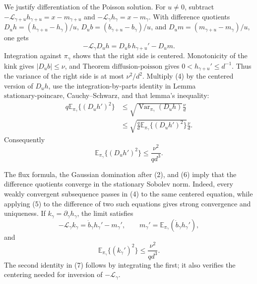 We justify differentiation of the Poisson solution.  For \(u\ne0\), subtract
\(-\mathcal L_{\gamma+u}h_{\gamma+u}=x-m_{\gamma+u}\) and
\(-\mathcal L_\gamma h_\gamma=x-m_\gamma\).  With difference quotients \(D_uh=(h_{\gamma+u}-h_\gamma)/u\), \(D_ub=(b_{\gamma+u}-b_\gamma)/u\), and \(D_um=(m_{\gamma+u}-m_\gamma)/u\), one gets
\[
 -\mathcal L_\gamma D_uh=D_ub\,h_{\gamma+u}'-D_um.           \tag{4}
\]
Integration against \(\pi_\gamma\) shows that the right side is centered.  Monotonicity of the kink gives \(|D_ub|\leq\nu\), and Theorem \(\mathrm{diffusion\mbox{-}poisson}\) gives \(0<h_{\gamma+u}'\leq d^{-1}\).  Thus the variance of the right side is at most \(\nu^2/d^2\).  Multiply (4) by the centered version of \(D_uh\), use the integration-by-parts identity in Lemma \(\mathrm{stationary\mbox{-}poincare}\), Cauchy--Schwarz, and that lemma's inequality:
\[
 \begin{split}
 q\mathbb E_{\pi_\gamma}\{(D_uh')^2\}
 &\leq\sqrt{\operatorname{Var}_{\pi_\gamma}(D_uh)}\frac\nu d\\
 &\leq\sqrt{\frac qd\mathbb E_{\pi_\gamma}\{(D_uh')^2\}}\frac\nu d.
                                                                    \tag{5}
 \end{split}
\]
Consequently
\[
 \mathbb E_{\pi_\gamma}\{(D_uh')^2\}
 \leq\frac{\nu^2}{qd^3}.                                     \tag{6}
\]

The flux formula, the Gaussian domination after (2), and (6) imply that the difference quotients converge in the stationary Sobolev norm.  Indeed, every weakly convergent subsequence passes in (4) to the same centered equation, while applying (5) to the difference of two such equations gives strong convergence and uniqueness.  If \(k_\gamma=\partial_\gamma h_\gamma\), the limit satisfies
\[
 -\mathcal L_\gamma k_\gamma
 =\dot b_\gamma h_\gamma'-m_\gamma',
 \qquad
 m_\gamma'=\mathbb E_{\pi_\gamma}(\dot b_\gamma h_\gamma'), \tag{7}
\]
and
\[
 \mathbb E_{\pi_\gamma}\{(k_\gamma')^2\}
 \leq\frac{\nu^2}{qd^3}.                                     \tag{8}
\]
The second identity in (7) follows by integrating the first; it also verifies the centering needed for inversion of \(-\mathcal L_\gamma\).

